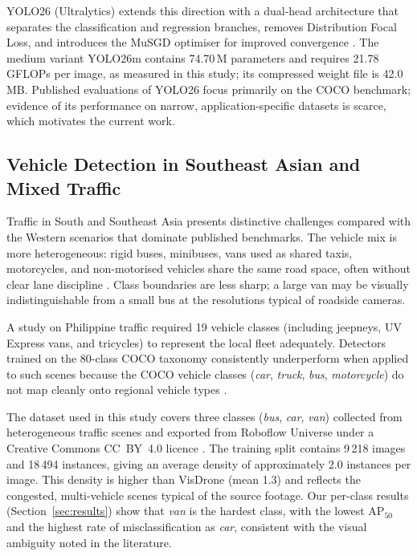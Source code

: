 YOLO26 (Ultralytics) extends this direction with a dual-head architecture that
separates the classification and regression branches, removes Distribution Focal Loss,
and introduces the MuSGD optimiser for improved convergence \cite{yolo262023}.
The medium variant YOLO26m contains 74.70\,M parameters and requires 21.78\,GFLOPs
per image, as measured in this study; its compressed weight file is 42.0\,MB.
Published evaluations of YOLO26 focus primarily on the COCO benchmark;
evidence of its performance on narrow, application-specific datasets is scarce,
which motivates the current work.

\subsection{Vehicle Detection in Southeast Asian and Mixed Traffic}

Traffic in South and Southeast Asia presents distinctive challenges compared with the
Western scenarios that dominate published benchmarks.
The vehicle mix is more heterogeneous: rigid buses, minibuses, vans used as shared
taxis, motorcycles, and non-motorised vehicles share the same road space, often
without clear lane discipline \cite{amin2021traffic}.
Class boundaries are less sharp; a large van may be visually indistinguishable from a
small bus at the resolutions typical of roadside cameras.

A study on Philippine traffic \cite{philippines2023} required 19 vehicle classes
(including jeepneys, UV Express vans, and tricycles) to represent the local fleet
adequately.
Detectors trained on the 80-class COCO taxonomy consistently underperform when applied
to such scenes because the COCO vehicle classes (\textit{car}, \textit{truck},
\textit{bus}, \textit{motorcycle}) do not map cleanly onto regional vehicle types
\cite{chen2018domain}.

The dataset used in this study covers three classes (\textit{bus}, \textit{car},
\textit{van}) collected from heterogeneous traffic scenes and exported from Roboflow
Universe under a Creative Commons CC~BY~4.0 licence \cite{roboflow_dataset}.
The training split contains 9\,218 images and 18\,494 instances, giving an average
density of approximately 2.0 instances per image.
This density is higher than VisDrone (mean 1.3) \cite{zhu2021visdrone} and reflects the
congested, multi-vehicle scenes typical of the source footage.
Our per-class results (Section~\ref{sec:results}) show that \textit{van} is the
hardest class, with the lowest AP$_{50}$ and the highest rate of misclassification as
\textit{car}, consistent with the visual ambiguity noted in the literature.

